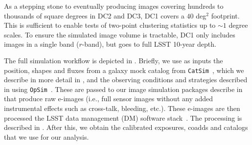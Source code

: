 \documentclass[twocolumn]{aastex62}
\newcommand{\as}[1]{{\textcolor{magenta}{{\textbf (AS: #1)}}}}
\begin{document}

As a stepping stone to eventually producing images covering hundreds to thousands of square degrees
in DC2 and DC3, DC1 covers a $40$ deg$^2$ footprint.  This is sufficient to enable tests of
two-point clustering statistics up to $\sim 1$ degree scales.  To ensure the simulated image volume is
tractable, DC1 only includes images in a single band ($r$-band), but goes to full LSST 10-year
depth. 

The full simulation workflow is depicted in . Briefly, we use as inputs the position, shapes and fluxes from a galaxy mock catalog from \texttt{CatSim}~\citep{2010SPIE.7738E..1OC,2014SPIE.9150E..14C}, which we describe in more detail in , and the observing conditions and strategies described in  using \texttt{OpSim}~\citep{2014SPIE.9150E..15D}. These are passed to our image simulation packages describe in  that produce raw e-images (i.e., full sensor images without any added instrumental effects such as cross-talk, bleeding, etc.). These e-images are then processed the LSST data management (DM) software stack~\citep{2015arXiv151207914J}. The processing is described in . After this, we obtain the calibrated exposures, coadds and catalogs that we use for our analysis.
\end{document}
